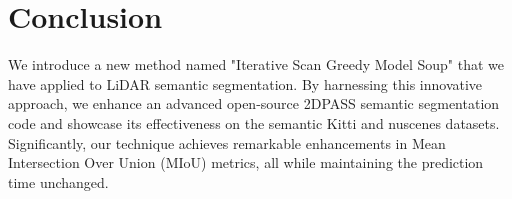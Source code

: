 \documentclass[10pt,twocolumn,letterpaper]{article}
\begin{document}
\section{Conclusion}
We introduce a new method named "Iterative Scan Greedy Model Soup" that we have applied to LiDAR semantic segmentation. By harnessing this innovative approach, we enhance an advanced open-source 2DPASS \cite{yan20222dpass} semantic segmentation code and showcase its effectiveness on the semantic Kitti and nuscenes datasets. Significantly, our technique achieves remarkable enhancements in Mean Intersection Over Union (MIoU) metrics, all while maintaining the prediction time unchanged.



\end{document}
